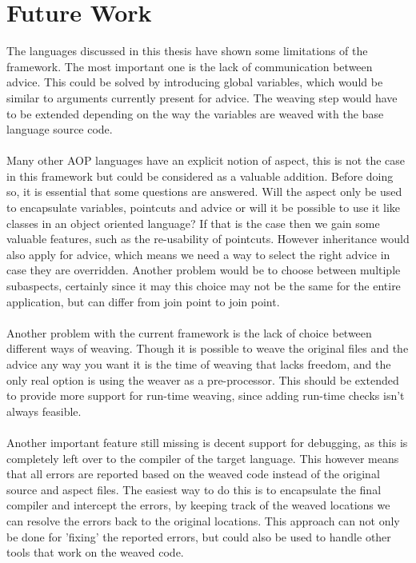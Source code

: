 \documentclass[a4paper]{report}
\begin{document}
\chapter{Future Work}
\label{chap:FutureWork}
The languages discussed in this thesis have shown some limitations of the framework. The most important one is the lack of communication between advice. This could be solved by introducing global variables, which would be similar to arguments currently present for advice. The weaving step would have to be extended depending on the way the variables are weaved with the base language source code.\\
\\
Many other AOP languages have an explicit notion of aspect, this is not the case in this framework but could be considered as a valuable addition. Before doing so, it is essential that some questions are answered. Will the aspect only be used to encapsulate variables, pointcuts and advice or will it be possible to use it like classes in an object oriented language? If that is the case then we gain some valuable features, such as the re-usability of pointcuts. However inheritance would also apply for advice, which means we need a way to select the right advice in case they are overridden. Another problem would be to choose between multiple subaspects, certainly since it may this choice may not be the same for the entire application, but can differ from join point to join point.\\
\\
Another problem with the current framework is the lack of choice between different ways of weaving. Though it is possible to weave the original files and the advice any way you want it is the time of weaving that lacks freedom, and the only real option is using the weaver as a pre-processor. This should be extended to provide more support for run-time weaving, since adding run-time checks isn't always feasible.\\
\\
Another important feature still missing is decent support for debugging, as this is completely left over to the compiler of the target language. This however means that all errors are reported based on the weaved code instead of the original source and aspect files. The easiest way to do this is to encapsulate the final compiler and intercept the errors, by keeping track of the weaved locations we can resolve the errors back to the original locations. This approach can not only be done for 'fixing' the reported errors, but could also be used to handle other tools that work on the weaved code.\\
\end{document}
